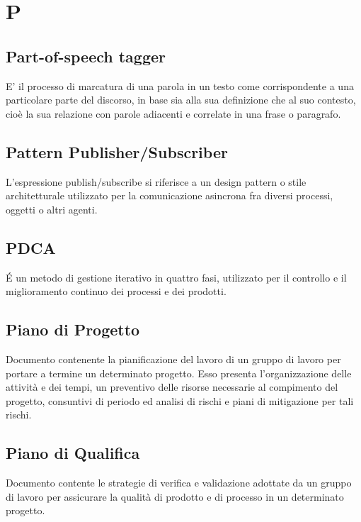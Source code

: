 \section*{P}

\subsection{Part-of-speech tagger}
E' il processo di marcatura di una parola in un testo come corrispondente a una particolare parte del discorso, in base sia alla sua definizione che al suo contesto, cioè la sua relazione con parole adiacenti e correlate in una frase o paragrafo.

\subsection{Pattern Publisher/Subscriber} 
L'espressione publish/subscribe si riferisce a un design pattern o stile architetturale utilizzato per la comunicazione asincrona fra diversi processi, oggetti o altri agenti.

\subsection{PDCA}
\'E un metodo di gestione iterativo in quattro fasi, utilizzato per il controllo e il miglioramento continuo dei processi e dei prodotti.
 
\subsection{Piano di Progetto}
Documento contenente la pianificazione del lavoro di un gruppo di lavoro per portare a termine un determinato progetto. Esso presenta l'organizzazione delle attività e dei tempi, un preventivo delle risorse necessarie al compimento del progetto, consuntivi di periodo ed analisi di rischi e piani di mitigazione per tali rischi.

\subsection{Piano di Qualifica}
Documento contente le strategie di verifica e validazione adottate da un gruppo di lavoro per assicurare la qualità di prodotto e di processo in un determinato progetto.

